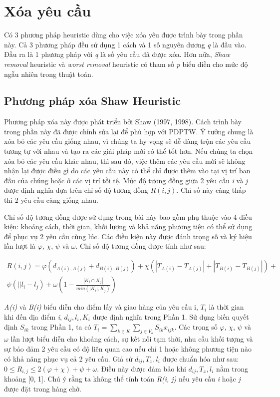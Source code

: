 \section{Xóa yêu cầu}
Có 3 phương pháp heuristic dùng cho việc xóa yêu được trình bày trong phần này. Cả 3 phương pháp đều sử dụng 1 cách và 1 số nguyên dương \textit{q} là đầu vào. Đầu ra là 1 phương pháp với \textit{q} là số yêu cầu đã được xóa. Hơn nữa, \textit{Shaw removal} heuristic và \textit{worst removal} heuristic có tham số \textit{p} biểu diễn cho mức độ ngẫu nhiên trong thuật toán.

\subsection{Phương pháp xóa Shaw Heuristic}
Phương pháp xóa này được phát triển bởi Shaw (1997, 1998). Cách trình bày trong phần này đã được chỉnh sửa lại để phù hợp với PDPTW. Ý tưởng chung là xóa bỏ các yêu cầu giống nhau, vì chúng ta hy vọng sẽ dễ dàng trộn các yêu cầu tương tự với nhau và tạo ra các giải pháp mới có thể tốt hơn. Nếu chúng ta chọn xóa bỏ các yêu cầu khác nhau, thì sau đó, việc thêm các yêu cầu mới sẽ không nhận lại được điều gì do các yêu cầu này có thể chỉ được thêm vào tại vị trí ban đầu của chúng hoặc ở các vị trí tồi tệ. Mức độ tương đồng giữa 2 yêu cầu \textit{i} và \textit{j} được định nghĩa dựa trên chỉ số độ tương đồng $R(i,j)$. Chỉ số này càng thấp thì 2 yêu cầu càng giống nhau.

Chỉ số độ tương đồng được sử dụng trong bài này bao gồm phụ thuộc vào 4 điều kiện: khoảng cách, thời gian, khối lượng và khả năng phương tiện có thể sử dụng để phục vụ 2 yêu cầu cùng lúc. Các điều kiện này được đánh trọng số và ký hiệu lần lượt là $\varphi$, $\chi$, $\psi$ và $\omega$. Chỉ số độ tương đồng được tính như sau:

\begin{equation}
\begin{split}
    R(i,j) = \varphi(d_{A(i), A(j)} + d_{B(i), B(j)}) + \chi(|T_{A(i)}-T_{A(j)}| + |T_{B(i)} - T_{B(j)}|)  + \\ \psi(||l_i - l_j) + \omega(1 - \frac{|K_i \cap K_j|}{min(|K_i|, K_j)})
\end{split}
\end{equation}

\textit{A(i)} và \textit{B(i)} biểu diễn cho điểm lấy và giao hàng của yêu cầu i, $T_i$ là thời gian khi đến địa điểm \textit{i}, $d_{ij}, l_{i}, K_i$ được định nghĩa trong Phần 1. Sử dụng biến quyết định $S_{ik}$ trong Phần 1, ta có $T_i = \sum_{k \in K} \sum_{j \in V_k} S_{ik} x_{ijk}$. Các trọng số $\varphi$, $\chi$, $\psi$ và $\omega$ lần lượt biểu diễn cho khoảng cách, sự kết nối tạm thời, nhu cầu khối tượng và sự bảo đảm 2 yêu cầu có độ liên quan cao nếu chỉ 1 hoặc không phương tiện nào có khả năng phục vụ cả 2 yêu cầu. Giả sử $d_{ij}, T_x, l_i$ được chuẩn hóa như sau: $0 \leqslant R_{i,j} \leqslant 2(\varphi + \chi) + \psi + \omega$. Điều này được đảm bảo khi $d_{ij}, T_x, l_i$ nằm trong khoảng [0, 1]. Chú ý rằng ta không thể tính toán \textit{R(i, j)} nếu yêu cầu \textit{i} hoặc \textit{j} được đặt trong hàng chờ.

